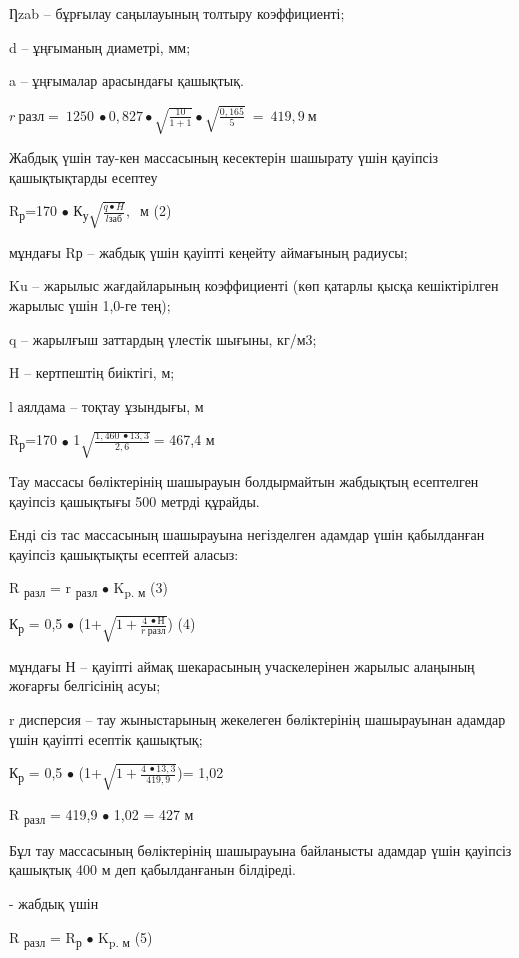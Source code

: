 Ƞzab -- бұрғылау саңылауының толтыру коэффициенті;

d -- ұңғыманың диаметрі, мм;

a -- ұңғымалар арасындағы қашықтық.

\(r\ разл = \ 1250\  \bullet 0,827 \bullet \sqrt{\frac{10}{1 + 1}} \bullet \sqrt{\frac{0,165}{5}}\  = \ 419,9\ м\)

Жабдық үшін тау-кен массасының кесектерін шашырату үшін қауіпсіз
қашықтықтарды есептеу

R\textsubscript{р}=170 \(\bullet\)
К\textsubscript{у}\(\sqrt{\frac{q \bullet H}{lзаб}},\ \) м (2)

мұндағы Rр -- жабдық үшін қауіпті кеңейту аймағының радиусы;

Ku -- жарылыс жағдайларының коэффициенті (көп қатарлы қысқа
кешіктірілген жарылыс үшін 1,0-ге тең);

q -- жарылғыш заттардың үлестік шығыны, кг/м3;

H -- кертпештің биіктігі, м;

l аялдама -- тоқтау ұзындығы, м

R\textsubscript{р}=170 \(\bullet\)
1\(\sqrt{\frac{1,460\  \bullet 13,3}{2,6}}\ \)= 467,4 м

Тау массасы бөліктерінің шашырауын болдырмайтын жабдықтың есептелген
қауіпсіз қашықтығы 500 метрді құрайды.

Енді сіз тас массасының шашырауына негізделген адамдар үшін қабылданған
қауіпсіз қашықтықты есептей аласыз:

R \textsubscript{разл} = r \textsubscript{разл} \(\bullet\)
K\textsubscript{p. м} (3)

К\textsubscript{р} = 0,5 \(\bullet\)
(1+\(\sqrt{1 + \frac{4\  \bullet Н}{r\ разл}}\)) (4)

мұндағы Н -- қауіпті аймақ шекарасының учаскелерінен жарылыс алаңының
жоғарғы белгісінің асуы;

r дисперсия -- тау жыныстарының жекелеген бөліктерінің шашырауынан
адамдар үшін қауіпті есептік қашықтық;

К\textsubscript{р} = 0,5 \(\bullet\)
(1+\(\sqrt{1 + \frac{4\  \bullet 13,3}{419,9}}\))= 1,02

R \textsubscript{разл} = 419,9 \(\bullet\) 1,02 = 427 м

Бұл тау массасының бөліктерінің шашырауына байланысты адамдар үшін
қауіпсіз қашықтық 400 м деп қабылданғанын білдіреді.

- жабдық үшін

R \textsubscript{разл} = R\textsubscript{р} \(\bullet\)
K\textsubscript{p. м} (5)


